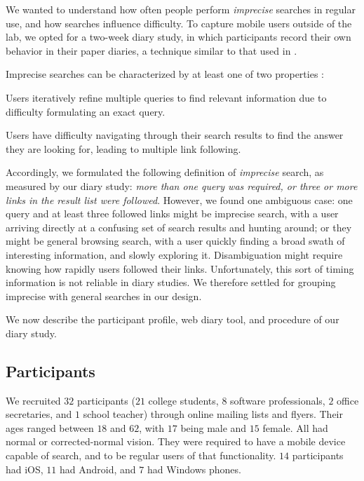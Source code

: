 We wanted to understand how often people perform \textit{imprecise} searches in regular use, and how searches influence difficulty. To capture mobile users outside of the lab, we opted for a two-week diary study, in which participants record their own behavior in their paper diaries, a technique similar to that used in \cite{Sohn:2008}. 

Imprecise searches can be characterized by at least one of two properties \cite{Lee:2012}:
\begin{tight_enumerate}
\item Users iteratively refine multiple queries to find relevant information due to difficulty formulating an exact query. 
\item Users have difficulty navigating through their search results to find the answer they are looking for, leading to multiple link following.
\end{tight_enumerate}

Accordingly, we formulated the following definition of \textit{imprecise} search, as measured by our diary study: \textit{more than one query was required, or three or more links in the result list were followed}. However, we found one ambiguous case: one query and at least three followed links might be imprecise search, with a user arriving directly at a confusing set of search results and hunting around; or they might be general browsing search, with a user quickly finding a broad swath of interesting information, and slowly exploring it. Disambiguation might require knowing how rapidly users followed their links. Unfortunately, this sort of timing information is not reliable in diary studies. We therefore settled for grouping imprecise with general searches in our design. 

We now describe the participant profile, web diary tool, and procedure of our diary study.

\subsection{Participants}
We recruited $32$ participants ($21$ college students, $8$ software professionals, $2$ office secretaries, and $1$ school teacher) through online mailing lists and flyers. Their ages ranged between $18$ and $62$, with $17$ being male and $15$ female. All had normal or corrected-normal vision. They were required to have a mobile device capable of search, and to be regular users of that functionality. $14$ participants had iOS, $11$ had Android, and $7$ had Windows phones. 

